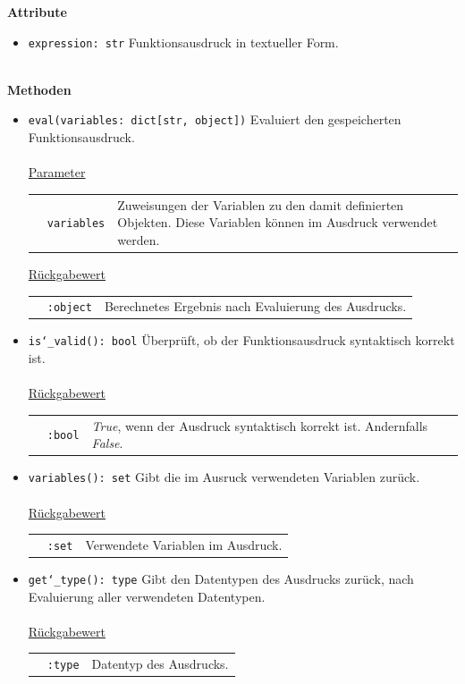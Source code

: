 \documentclass{article}
\begin{document}
\textbf{{Attribute}}
\begin{itemize}
\item \texttt{expression: str} \newline Funktionsausdruck in textueller Form.
\\\\
\end{itemize}

\textbf{{Methoden}}
\begin{itemize}
\item \texttt{eval(variables: dict[str, object])} \newline Evaluiert den gespeicherten Funktionsausdruck.
\\\\
\underline{{Parameter}}

\begin{tabular}{lll}
 & \texttt{variables} & Zuweisungen der Variablen zu den damit definierten Objekten. Diese Variablen können im Ausdruck verwendet werden. \\
\end{tabular}

\underline{{Rückgabewert}}

\begin{tabular}{lll}
 & \texttt{:object} & Berechnetes Ergebnis nach Evaluierung des Ausdrucks. \\
\end{tabular}

\item \texttt{is\char`_valid(): bool} \newline Überprüft, ob der Funktionsausdruck syntaktisch korrekt ist.
\\\\
\underline{{Rückgabewert}}

\begin{tabular}{lll}
 & \texttt{:bool} & \textit{True}, wenn der Ausdruck syntaktisch korrekt ist. Andernfalls \textit{False}. \\
\end{tabular}

\item \texttt{variables(): set} \newline Gibt die im Ausruck verwendeten Variablen zurück.
\\\\
\underline{{Rückgabewert}}

\begin{tabular}{lll}
 & \texttt{:set} & Verwendete Variablen im Ausdruck. \\
\end{tabular}

\item \texttt{get\char`_type(): type} \newline Gibt den Datentypen des Ausdrucks zurück, nach Evaluierung aller verwendeten Datentypen.
\\\\
\underline{{Rückgabewert}}

\begin{tabular}{lll}
 & \texttt{:type} & Datentyp des Ausdrucks. \\
\end{tabular}
\end{itemize}
\end{document}
